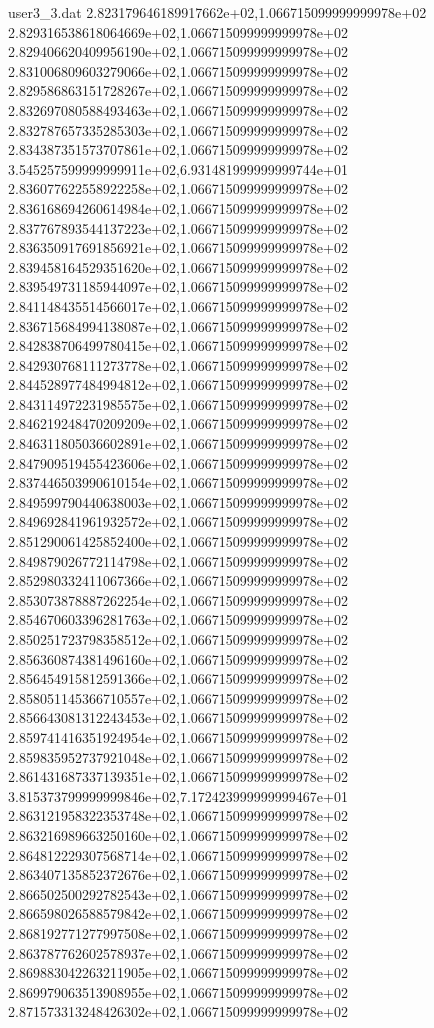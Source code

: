 \begin{filecontents}{user3_3.dat}
2.823179646189917662e+02,1.066715099999999978e+02
2.829316538618064669e+02,1.066715099999999978e+02
2.829406620409956190e+02,1.066715099999999978e+02
2.831006809603279066e+02,1.066715099999999978e+02
2.829586863151728267e+02,1.066715099999999978e+02
2.832697080588493463e+02,1.066715099999999978e+02
2.832787657335285303e+02,1.066715099999999978e+02
2.834387351573707861e+02,1.066715099999999978e+02
3.545257599999999911e+02,6.931481999999999744e+01
2.836077622558922258e+02,1.066715099999999978e+02
2.836168694260614984e+02,1.066715099999999978e+02
2.837767893544137223e+02,1.066715099999999978e+02
2.836350917691856921e+02,1.066715099999999978e+02
2.839458164529351620e+02,1.066715099999999978e+02
2.839549731185944097e+02,1.066715099999999978e+02
2.841148435514566017e+02,1.066715099999999978e+02
2.836715684994138087e+02,1.066715099999999978e+02
2.842838706499780415e+02,1.066715099999999978e+02
2.842930768111273778e+02,1.066715099999999978e+02
2.844528977484994812e+02,1.066715099999999978e+02
2.843114972231985575e+02,1.066715099999999978e+02
2.846219248470209209e+02,1.066715099999999978e+02
2.846311805036602891e+02,1.066715099999999978e+02
2.847909519455423606e+02,1.066715099999999978e+02
2.837446503990610154e+02,1.066715099999999978e+02
2.849599790440638003e+02,1.066715099999999978e+02
2.849692841961932572e+02,1.066715099999999978e+02
2.851290061425852400e+02,1.066715099999999978e+02
2.849879026772114798e+02,1.066715099999999978e+02
2.852980332411067366e+02,1.066715099999999978e+02
2.853073878887262254e+02,1.066715099999999978e+02
2.854670603396281763e+02,1.066715099999999978e+02
2.850251723798358512e+02,1.066715099999999978e+02
2.856360874381496160e+02,1.066715099999999978e+02
2.856454915812591366e+02,1.066715099999999978e+02
2.858051145366710557e+02,1.066715099999999978e+02
2.856643081312243453e+02,1.066715099999999978e+02
2.859741416351924954e+02,1.066715099999999978e+02
2.859835952737921048e+02,1.066715099999999978e+02
2.861431687337139351e+02,1.066715099999999978e+02
3.815373799999999846e+02,7.172423999999999467e+01
2.863121958322353748e+02,1.066715099999999978e+02
2.863216989663250160e+02,1.066715099999999978e+02
2.864812229307568714e+02,1.066715099999999978e+02
2.863407135852372676e+02,1.066715099999999978e+02
2.866502500292782543e+02,1.066715099999999978e+02
2.866598026588579842e+02,1.066715099999999978e+02
2.868192771277997508e+02,1.066715099999999978e+02
2.863787762602578937e+02,1.066715099999999978e+02
2.869883042263211905e+02,1.066715099999999978e+02
2.869979063513908955e+02,1.066715099999999978e+02
2.871573313248426302e+02,1.066715099999999978e+02

\end{filecontents}
